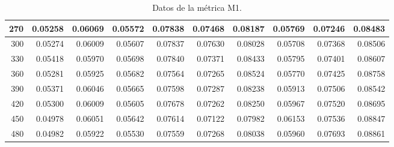 \begin{table}[h]
\begin{tabular}{|r|r|r|r|r|r|r|r|r|r|}
			\hline \tiny 270 &{\tiny 0.05258}&{\tiny 0.06069}&{\tiny 0.05572}&{\tiny 0.07838}&{\tiny 0.07468}&{\tiny 0.08187}&{\tiny 0.05769}&{\tiny 0.07246} &{\tiny 0.08483} \\											
			\hline \tiny 300 &{\tiny 0.05274}&{ \tiny 0.06009}&{\tiny 0.05607}&{\tiny 0.07837}&{\tiny 0.07630}&{\tiny 0.08028}&{\tiny 0.05708}&{\tiny 0.07368} &{\tiny 0.08506} \\											
			\hline \tiny 330 &{\tiny 0.05418}&{\tiny 0.05970}&{\tiny 0.05698}&{\tiny 0.07840}&{\tiny 0.07371}&{\tiny 0.08433}&{\tiny 0.05795}&{\tiny 0.07401} &{\tiny 0.08607} \\											
			\hline \tiny 360 &{\tiny 0.05281}&{\tiny 0.05925}&{\tiny 0.05682}&{\tiny 0.07564}&{\tiny 0.07265}&{\tiny 0.08524}&{\tiny 0.05770}&{\tiny 0.07425} &{\tiny 0.08758} \\											
			\hline \tiny 390 &{\tiny 0.05371}&{\tiny 0.06046}&{\tiny 0.05665}&{\tiny 0.07598}&{\tiny 0.07287}&{\tiny 0.08238}&{\tiny 0.05913}&{\tiny 0.07506} &{\tiny 0.08542} \\											
			\hline \tiny 420 &{\tiny 0.05300}&{\tiny 0.06009}&{\tiny 0.05605}&{\tiny 0.07678}&{\tiny 0.07262}&{\tiny 0.08250}&{\tiny 0.05967}&{\tiny 0.07520} &{\tiny 0.08695} \\											
			\hline \tiny 450 &{\tiny 0.04978}&{\tiny 0.06051}&{\tiny 0.05642}&{\tiny 0.07614}&{\tiny 0.07122}&{\tiny 0.07982}&{\tiny 0.06153}&{\tiny 0.07536} &{\tiny 0.08847} \\											
			\hline \tiny 480 &{\tiny 0.04982}&{\tiny 0.05922}&{\tiny 0.05530}&{\tiny 0.07559}&{\tiny 0.07268}&{\tiny 0.08038}&{\tiny 0.05960}&{\tiny 0.07693} &{\tiny 0.08861} \\																	
			\hline								
		\end{tabular}	
	  \caption{Datos de la m\'etrica M1.} 
   \label{tabA1}	
\end{table}


